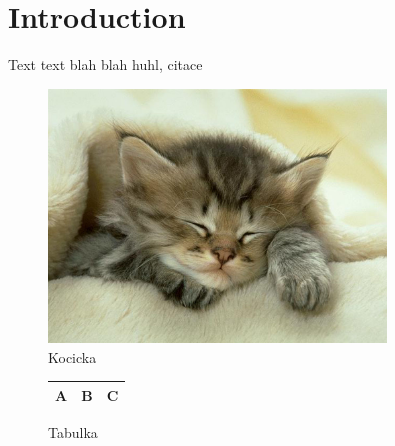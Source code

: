 \section{Introduction}

Text text blah blah huhl, citace \cite{cameraModule}

\begin{figure}[h]
\includegraphics[width=0.8\textwidth]{fig/kocicka.jpg}
\caption{Kocicka}
\end{figure}

\begin{figure}[h]
\begin{tabular}{|c|c|c|}
\hline
A & B & C \\
\hline
\end{tabular}
\caption{Tabulka}
\end{figure}